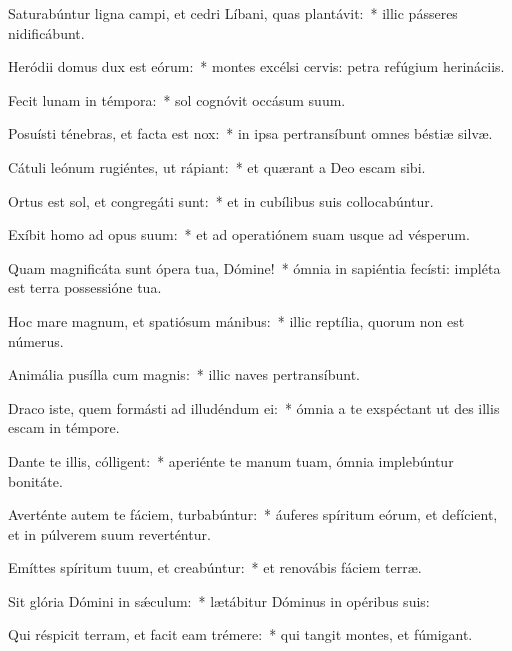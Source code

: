 \item Saturabúntur ligna campi, et cedri Líbani, quas plantávit:~* illic pásseres nidificábunt.

\item Heródii domus dux est eórum:~* montes excélsi cervis: petra refúgium herináciis.

\item Fecit lunam in témpora:~* sol cognóvit occásum suum.

\item Posuísti ténebras, et facta est nox:~* in ipsa pertransíbunt omnes béstiæ silvæ.

\item Cátuli leónum rugiéntes, ut rápiant:~* et quærant a Deo escam sibi.

\item Ortus est sol, et congregáti sunt:~* et in cubílibus suis collocabúntur.

\item Exíbit homo ad opus suum:~* et ad operatiónem suam usque ad vésperum.

\item Quam magnificáta sunt ópera tua, Dómine!~* ómnia in sapiéntia fecísti: impléta est terra possessióne tua.

\item Hoc mare magnum, et spatiósum mánibus:~* illic reptília, quorum non est númerus.

\item Animália pusílla cum magnis:~* illic naves pertransíbunt.

\item Draco iste, quem formásti ad illudéndum ei:~* ómnia a te exspéctant ut des illis escam in témpore.

\item Dante te illis, cólligent:~* aperiénte te manum tuam, ómnia implebúntur bonitáte.

\item Averténte autem te fáciem, turbabúntur:~* áuferes spíritum eórum, et defícient, et in púlverem suum reverténtur.

\item Emíttes spíritum tuum, et creabúntur:~* et renovábis fáciem terræ.

\item Sit glória Dómini in sǽculum:~* lætábitur Dóminus in opéribus suis:

\item Qui réspicit terram, et facit eam trémere:~* qui tangit montes, et fúmigant.

